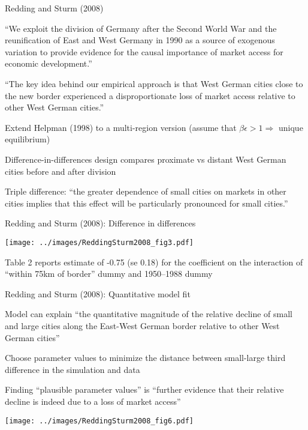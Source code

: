 \documentclass[11pt,notes=hide,aspectratio=169]{beamer}
\begin{document}
\begin{frame}{Redding and Sturm (2008)}
\begin{itemize}
{\small
	\item ``We exploit the division of Germany after the Second World War and the reunification of East and West Germany in 1990 as a source of exogenous variation to provide evidence for the causal importance of market access for economic development.''
	\item ``The key idea behind our empirical approach is that West German cities close to the new border experienced a disproportionate loss of market access relative to other West German cities.''
	\item Extend Helpman (1998) to a multi-region version (assume that $\beta\epsilon>1 \Rightarrow$ unique equilibrium)
	\item Difference-in-differences design compares proximate vs distant West German cities before and after division
	\item Triple difference: ``the greater dependence of small cities on markets in other cities implies that this effect will be particularly pronounced for small cities.''
}
\end{itemize}
\end{frame}
\begin{frame}{Redding and Sturm (2008): Difference in differences}
\begin{center}
\texttt{[image: ../images/ReddingSturm2008\_fig3.pdf]}
\end{center}
{\small Table 2 reports estimate of -0.75 (se 0.18) for the coefficient on the interaction of ``within 75km of border'' dummy and 1950--1988 dummy\par}
\end{frame}
\begin{frame}{Redding and Sturm (2008): Quantitative model fit}
\begin{itemize}
	{\small
	\item Model can explain ``the quantitative magnitude of the relative decline of small and large cities along the East-West German border relative to other West German cities''
	\item Choose parameter values to minimize the distance between small-large third difference in the simulation and data
	\item Finding ``plausible parameter values'' is ``further evidence that their relative decline is indeed due to a loss of market access''
	}
\end{itemize}
\begin{center}
\texttt{[image: ../images/ReddingSturm2008\_fig6.pdf]}
\end{center}
\end{frame}
\end{document}
